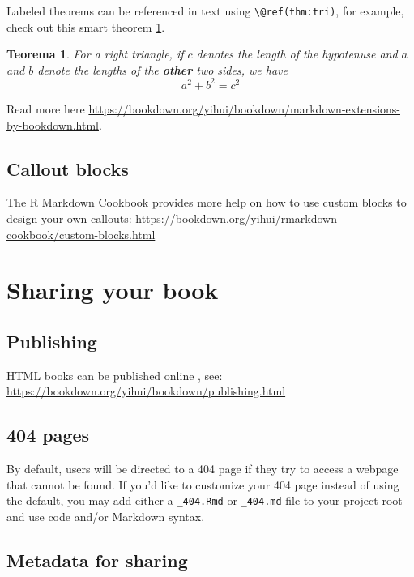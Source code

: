 \documentclass[
  12pt,
  twoside]{book}
\newtheorem{theorem}{Teorema}
\theoremstyle{definition}
\theoremstyle{definition}
\theoremstyle{definition}
\theoremstyle{definition}
\theoremstyle{remark}
\begin{document}
Labeled theorems can be referenced in text using \texttt{\textbackslash{}@ref(thm:tri)}, for example, check out this smart theorem \ref{thm:tri}.

\begin{theorem}
\protect\hypertarget{thm:tri}{}\label{thm:tri}For a right triangle, if \(c\) denotes the \emph{length} of the hypotenuse
and \(a\) and \(b\) denote the lengths of the \textbf{other} two sides, we have
\[a^2 + b^2 = c^2\]
\end{theorem}

Read more here \url{https://bookdown.org/yihui/bookdown/markdown-extensions-by-bookdown.html}.

\hypertarget{callout-blocks}{%
\section{Callout blocks}\label{callout-blocks}}

The R Markdown Cookbook provides more help on how to use custom blocks to design your own callouts: \url{https://bookdown.org/yihui/rmarkdown-cookbook/custom-blocks.html}

\hypertarget{sharing-your-book}{%
\chapter*{Sharing your book}\label{sharing-your-book}}

\hypertarget{publishing}{%
\section{Publishing}\label{publishing}}

HTML books can be published online , see: \url{https://bookdown.org/yihui/bookdown/publishing.html}

\hypertarget{pages}{%
\section{404 pages}\label{pages}}

By default, users will be directed to a 404 page if they try to access a webpage that cannot be found. If you'd like to customize your 404 page instead of using the default, you may add either a \texttt{\_404.Rmd} or \texttt{\_404.md} file to your project root and use code and/or Markdown syntax.

\hypertarget{metadata-for-sharing}{%
\section{Metadata for sharing}\label{metadata-for-sharing}}
\end{document}

